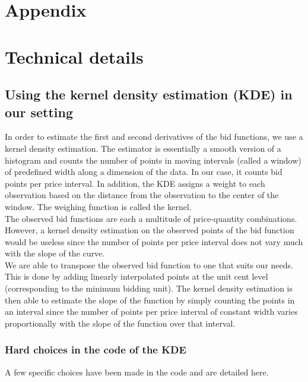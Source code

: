 \newpage
\begin{subappendices}
\section*{Appendix}

\section{Technical details}
\label{Techdetails}

\subsection{Using the kernel density estimation (KDE) in our setting}
\label{implementingkernel}
In order to estimate the first and second derivatives of the bid functions, we use a kernel density estimation. The estimator is essentially a smooth version of a histogram and counts the number of points in moving intervals (called a window) of predefined width along a dimension of the data. In our case, it counts bid points per price interval. In addition, the KDE assigns a weight to each observation based on the distance from the observation to the center of the window. The weighing function is called the kernel. \\

The observed bid functions are each a multitude of price-quantity combinations. However, a kernel density estimation on the observed points of the bid function would be useless since the number of points per price interval does not vary much with the slope of the curve. \\

We are able to transpose the observed bid function to one that suits our needs. This is done by adding linearly interpolated points at the unit cent level (corresponding to the minimum bidding unit). The kernel density estimation is then able to estimate the slope of the function by simply counting the points in an interval since the number of points per price interval of constant width varies proportionally with the slope of the function over that interval. 

\subsubsection{Hard choices in the code of the KDE}
\label{hardcodechoices}
A few specific choices have been made in the code and are detailed here. 

\end{subappendices}
